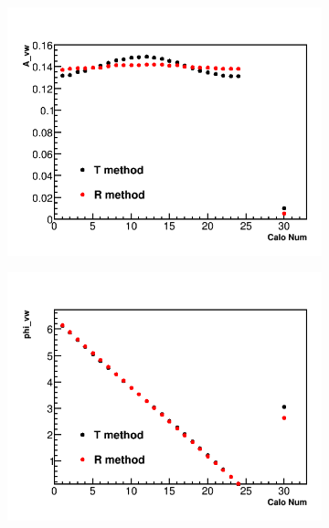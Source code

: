 \documentclass[12pt,letterpaper]{article}
\begin{document}
\begin{figure}[]
\centering
    \begin{subfigure}[t]{0.45\textwidth}
        \centering
        \includegraphics[width=\textwidth]{JamesMC_Avw_Compared}
        \caption{}
    \end{subfigure}%
    \begin{subfigure}[t]{0.45\textwidth}
        \centering
        \includegraphics[width=\textwidth]{JamesMC_Phivw_Compared}
        \caption{}
    \end{subfigure}


\end{figure}
\end{document}
